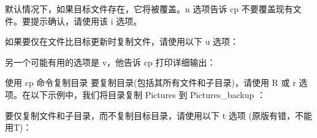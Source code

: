 \documentclass[letterpaper,12pt,english]{sphinxmanual}
\begin{document}
默认情况下，如果目标文件存在，它将被覆盖。\sphinxhyphen{}n 选项告诉 cp 不要覆盖现有文件。要提示确认，请使用该 \sphinxhyphen{}i 选项。

\begin{sphinxVerbatim}[commandchars=\\\{\}]
   
\end{sphinxVerbatim}

如果要仅在文件比目标更新时复制文件，请使用以下 \sphinxhyphen{}u 选项：

\begin{sphinxVerbatim}[commandchars=\\\{\}]
   
\end{sphinxVerbatim}

另一个可能有用的选项是 \sphinxhyphen{}v，他告诉 cp 打印详细输出：

\begin{sphinxVerbatim}[commandchars=\\\{\}]
   
  
\end{sphinxVerbatim}

使用 cp 命令复制目录
要复制目录(包括其所有文件和子目录)，请使用 \sphinxhyphen{}R 或 \sphinxhyphen{}r 选项。在以下示例中，我们将目录复制 Pictures 到 Pictures\_backup ：

\begin{sphinxVerbatim}[commandchars=\\\{\}]
   
\end{sphinxVerbatim}

要仅复制文件和子目录，而不复制目标目录，请使用以下 \sphinxhyphen{}t 选项 (原版有错，不能用\sphinxhyphen{}T)：

\begin{sphinxVerbatim}[commandchars=\\\{\}]
   
\end{sphinxVerbatim}
\end{document}
